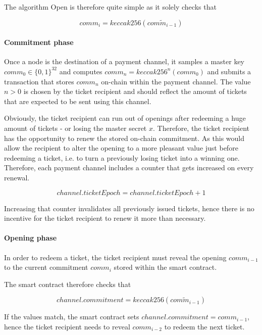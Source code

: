 The algorithm \textsf{Open} is therefore quite simple as it solely checks that

$$ comm_i = keccak256 (\widetilde{comm_{i-1}}) $$

\paragraph{Commitment phase}
\label{sec:incentives:commitment:commitmentphase}

Once a node is the destination of a payment channel, it samples a master key $comm_0 \in \{ 0, 1\} ^32$ and computes $comm_n = keccak256^n(comm_0)$ and submits a transaction that stores $comm_n$ on-chain within the payment channel. The value $n > 0$ is chosen by the ticket recipient and should reflect the amount of tickets that are expected to be sent using this channel.

Obviously, the ticket recipient can run out of openings after redeeming a huge amount of tickets - or losing the master secret $x$. Therefore, the ticket recipient has the opportunity to renew the stored on-chain commitment. As this would allow the recipient to alter the opening to a more pleasant value just before redeeming a ticket, i.e. to turn a previously losing ticket into a winning one. Therefore, each payment channel includes a counter that gets increased on every renewal.

$$ channel.ticketEpoch = channel.ticketEpoch + 1 $$

Increasing that counter invalidates all previously issued tickets, hence there is no incentive for the ticket recipient to renew it more than necessary.

\paragraph{Opening phase}

In order to redeem a ticket, the ticket recipient must reveal the opening $comm_{i-1}$ to the current commitment $comm_i$ stored within the smart contract.

The smart contract therefore checks that

$$ channel.commitment = keccak256 (\widetilde{comm_{i-1}}) $$

If the values match, the smart contract sets $channel.commitment = comm_{i-1}$, hence the ticket recipient needs to reveal $comm_{i-2}$ to redeem the next ticket.
